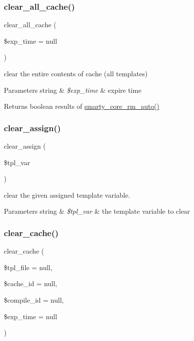 \subsubsection{\texorpdfstring{clear\+\_\+all\+\_\+cache()}{clear\_all\_cache()}}
{\footnotesize\ttfamily clear\+\_\+all\+\_\+cache (\begin{DoxyParamCaption}\item[{}]{\$exp\+\_\+time = {\ttfamily null} }\end{DoxyParamCaption})}

clear the entire contents of cache (all templates)


\begin{DoxyParams}[1]{Parameters}
string & {\em \$exp\+\_\+time} & expire time \\
\hline
\end{DoxyParams}
\begin{DoxyReturn}{Returns}
boolean results of \mbox{\hyperlink{}{smarty\+\_\+core\+\_\+rm\+\_\+auto()}} 
\end{DoxyReturn}
\mbox{\label{class_smarty_ad0188dcb261ac235ac70c141f2e6657e}} 
\subsubsection{\texorpdfstring{clear\+\_\+assign()}{clear\_assign()}}
{\footnotesize\ttfamily clear\+\_\+assign (\begin{DoxyParamCaption}\item[{}]{\$tpl\+\_\+var }\end{DoxyParamCaption})}

clear the given assigned template variable.


\begin{DoxyParams}[1]{Parameters}
string & {\em \$tpl\+\_\+var} & the template variable to clear \\
\hline
\end{DoxyParams}
\mbox{\label{class_smarty_a6b5412f074996dea92d89b32a13880d8}} 
\subsubsection{\texorpdfstring{clear\+\_\+cache()}{clear\_cache()}}
{\footnotesize\ttfamily clear\+\_\+cache (\begin{DoxyParamCaption}\item[{}]{\$tpl\+\_\+file = {\ttfamily null},  }\item[{}]{\$cache\+\_\+id = {\ttfamily null},  }\item[{}]{\$compile\+\_\+id = {\ttfamily null},  }\item[{}]{\$exp\+\_\+time = {\ttfamily null} }\end{DoxyParamCaption})}

